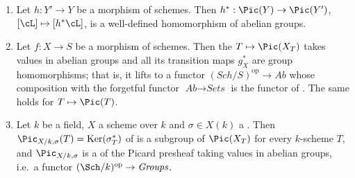 \begin{lemma}
\label{lem:pc-pic-group-valued}
\begin{enumerate}
\item Let $h:Y'\to Y$ be a morphism of schemes.  Then
$h^*:\Pic(Y)\to\Pic(Y')$, $[\cL]\mapsto[h^*\cL]$, is a well-defined
homomorphism of abelian groups.
\item Let $f:X\to S$ be a morphism of schemes.  Then the
 $T\mapsto\Pic(X_T)$
takes values in abelian groups and all its transition maps $g_X^*$ are
group homomorphisms; that is, it lifts to a functor
$(\mathit{Sch}/S)^{\mathrm{op}}\to\textit{Ab}$ whose composition with
the forgetful functor $\textit{Ab}\to\textit{Sets}$ is the functor of
.  The same holds for
$T\mapsto\Pic(T)$.
\item Let $k$ be a field, $X$ a scheme over $k$ and $\sigma\in X(k)$ a
.  Then
$\Pic_{X/k,\sigma}(T)=\operatorname{Ker}(\sigma_T^*)$ of
 is a subgroup of $\Pic(X_T)$ for every
$k$-scheme $T$, and $\Pic_{X/k,\sigma}$ is a
 of the Picard presheaf taking
values in abelian groups, i.e.\ a functor
$(\Sch/k)^{\mathrm{op}}\to\textit{Groups}$.
\end{enumerate}
\end{lemma}
